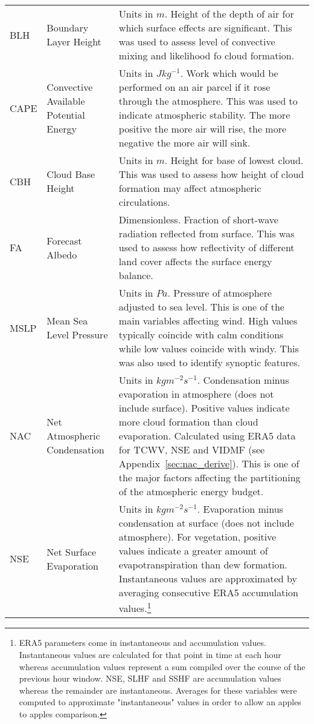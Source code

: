 \begin{landscape}
\begin{longtable}{P{2cm}P{3cm}P{15cm}}
		BLH & Boundary Layer Height & Units in $m$. Height of the depth of air for which surface effects are significant. This was used to assess level of convective mixing and likelihood fo cloud formation. \\
		CAPE & Convective Available Potential Energy & Units in $J kg^{-1}$. Work which would be performed on an air parcel if it rose through the atmosphere. This was used to indicate atmospheric stability. The more positive the more air will rise, the more negative the more air will sink. \\
		CBH & Cloud Base Height & Units in $m$. Height for base of lowest cloud. This was used to assess how height of cloud formation may affect atmospheric circulations. \\
		FA & Forecast Albedo & Dimensionless. Fraction of short-wave radiation reflected from surface. This was used to assess how reflectivity of different land cover affects the surface energy balance. \\
		MSLP & Mean Sea Level Pressure & Units in $Pa$. Pressure of atmosphere adjusted to sea level. This is one of the main variables affecting wind. High values typically coincide with calm conditions while low values coincide with windy. This was also used to identify synoptic features. \\
		NAC & Net Atmospheric Condensation & Units in $kg m^{-2} s^{-1}$. Condensation minus evaporation in atmosphere (does not include surface). Positive values indicate more cloud formation than cloud evaporation. Calculated using ERA5 data for TCWV, NSE and VIDMF (see Appendix~\ref{sec:nac_derive}). This is one of the major factors affecting the partitioning of the atmospheric energy budget. \\
		NSE & Net Surface Evaporation & Units in $kg m^{-2} s^{-1}$. Evaporation minus condensation at surface (does not include atmosphere). For vegetation, positive values indicate a greater amount of evapotranspiration than dew formation. Instantaneous values are approximated by averaging consecutive ERA5 accumulation values.\footnote{ERA5 parameters come in instantaneous and accumulation values. Instantaneous values are calculated for that point in time at each hour whereas accumulation values represent a sum compiled over the course of the previous hour window. NSE, SLHF and SSHF are accumulation values whereas the remainder are instantaneous. Averages for these variables were computed to approximate "instantaneous" values in order to allow an apples to apples comparison.} \\

\end{longtable}
\end{landscape}
